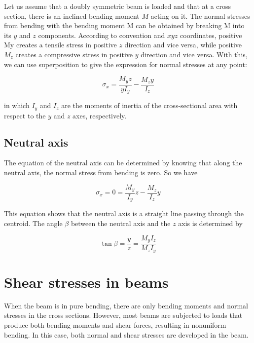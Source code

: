 \documentclass[
10pt,
a4paper,
openany,
svgnames,
]{kaobook} %
\begin{document}
Let us assume that a doubly symmetric beam is loaded and that at a cross section, there is an inclined bending moment $M$ acting on it. The normal stresses from bending with the bending moment M can be obtained by breaking M into its $y$ and $z$ components. According to convention and $xyz$ coordinates, positive My creates a tensile stress in positive $z$ direction and vice versa, while positive $M_z$ creates a compressive stress in positive $y$ direction and vice versa. With this, we can use superposition to give the expression for normal stresses at any point:

\begin{equation}
  \sigma_x = \frac{M_yz}{yI_y} - \frac{M_zy}{I_z}
\end{equation}

in which $I_y$ and $I_z$ are the moments of inertia of the cross-sectional area with respect to the $y$ and $z$ axes, respectively.

\subsection{Neutral axis}

The equation of the neutral axis can be determined by knowing that along the neutral axis, the normal stress from bending is zero. So we have

\begin{equation}
  \sigma_x = 0 = \frac{M_y}{I_y}z - \frac{M_z}{I_z}y
\end{equation}

This equation shows that the neutral axis is a straight line passing through the centroid. The angle $\beta$ between the neutral axis and the $z$ axis is determined by

\begin{equation}
  \tan \beta  = \frac{y}{z} = \frac{M_yI_z}{M_zI_y}
\end{equation}

\section{Shear stresses in beams}

When the beam is in pure bending, there are only bending moments and normal stresses in the cross sections. However, most beams are subjected to loads that produce both bending moments and shear forces, resulting in nonuniform bending. In this case, both normal and shear stresses are developed in the beam.
\end{document}
